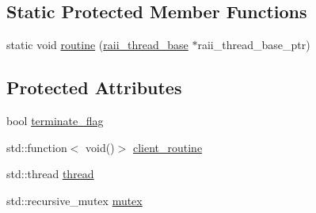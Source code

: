 \subsection*{Static Protected Member Functions}
\begin{DoxyCompactItemize}
\item 
static void \hyperlink{classxstd_1_1raii__thread__base_aac990e420873b2bb520e677156c37978}{routine} (\hyperlink{classxstd_1_1raii__thread__base}{raii\-\_\-thread\-\_\-base} $\ast$raii\-\_\-thread\-\_\-base\-\_\-ptr)
\end{DoxyCompactItemize}
\subsection*{Protected Attributes}
\begin{DoxyCompactItemize}
\item 
bool \hyperlink{classxstd_1_1raii__thread__base_aaac3bfb5572d71de17cb71d7ed0bb15c}{terminate\-\_\-flag}
\item 
std\-::function$<$ void()$>$ \hyperlink{classxstd_1_1raii__thread__base_a6b3e160c7eb131008410a16c460b03ff}{client\-\_\-routine}
\item 
std\-::thread \hyperlink{classxstd_1_1raii__thread__base_a664b3c47514557c3047e4ee0d7d9f25f}{thread}
\item 
std\-::recursive\-\_\-mutex \hyperlink{classxstd_1_1raii__thread__base_a9d9e01fced1a4f58ea5a9cc165f54fe3}{mutex}
\end{DoxyCompactItemize}


